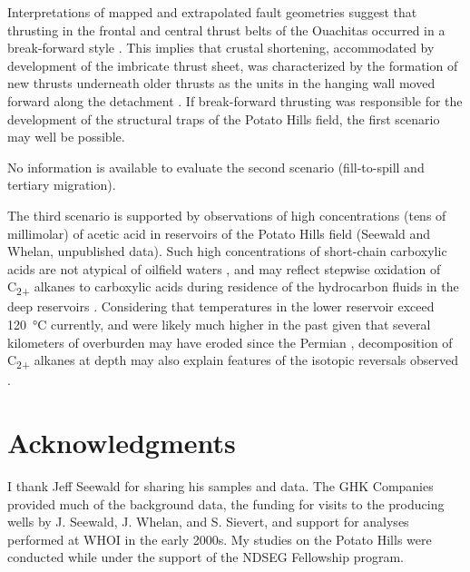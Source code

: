 Interpretations of mapped and extrapolated fault geometries suggest that
thrusting in the frontal and central thrust belts of the Ouachitas
occurred in a break-forward style \parencite{Miser_1929_OGS,Cemen++_2002}.
This implies that crustal shortening, accommodated by development of the
imbricate thrust sheet, was characterized by the formation of new
thrusts underneath older thrusts as the units in the hanging wall moved
forward along the detachment \parencite{Boyer+Elliott_1982_AAPGB,Shaw++_1999_GSAB}. If break-forward thrusting was responsible for the development of
the structural traps of the Potato Hills field, the first scenario may
well be possible.

No information is available to evaluate the second scenario
(fill-to-spill and tertiary migration).

The third scenario is supported by observations of high concentrations
(tens of millimolar) of acetic acid in reservoirs of the Potato Hills
field (Seewald and Whelan, unpublished data). Such high concentrations
of short-chain carboxylic acids are not atypical of oilfield waters
\parencite{Kharaka++_1973_GCA,Willey++_1975_GCA,Carothers+Kharaka_1978_AAPGB,Seewald_2003_N}, and may reflect stepwise oxidation of
C\textsubscript{2+} alkanes to carboxylic acids during residence of the
hydrocarbon fluids in the deep reservoirs \parencite{Shock_1988_G,Seewald_2001_GCA_model}.
Considering that temperatures in the lower reservoir exceed 120~°C
currently, and were likely much higher in the past given that several
kilometers of overburden may have eroded since the Permian \parencite{Godo++_2011_AAPG-ACE}, decomposition of C\textsubscript{2+} alkanes at depth may also
explain features of the isotopic reversals observed \parencite{Burruss+Laughrey_2010_OG,Tilley++_2011_AAPGB,Zumberge++_2012_MPG,Tilley+Muehlenbachs_2013_CG}.

\section*{Acknowledgments}

I thank Jeff Seewald for sharing his samples and data. The GHK Companies
provided much of the background data, the funding for visits to the
producing wells by J. Seewald, J. Whelan, and S. Sievert, and support
for analyses performed at WHOI in the early 2000s. My studies on the
Potato Hills were conducted while under the support of the NDSEG
Fellowship program.








